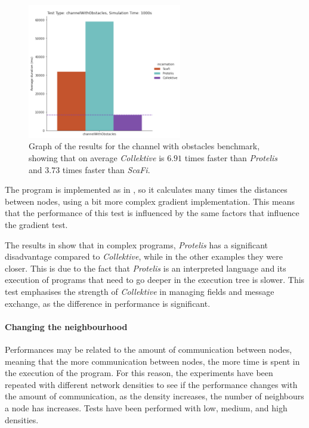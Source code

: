 \begin{figure}[ht!]
    \centering
    \includegraphics[width=0.6\textwidth]{figures/channel-results}
    \caption{Graph of the results for the channel with obstacles benchmark, showing that on average \emph{Collektive} is $6.91$ times faster
    than \emph{Protelis} and $3.73$ times faster than \emph{ScaFi}.}
    \label{fig:channel-with-obstacles}
\end{figure}

The program is implemented as in , so it calculates many times the distances
between nodes, using a bit more complex gradient implementation.
This means that the performance of this test is influenced by the same factors that influence the gradient test.

The results in  show that in complex programs, \emph{Protelis} has a significant
disadvantage compared to \emph{Collektive}, while in the other examples they were closer.
This is due to the fact that \emph{Protelis} is an interpreted language and its execution of programs that need to go
deeper in the execution tree is slower.
This test emphasises the strength of \emph{Collektive} in managing fields and message exchange, as the difference in
performance is significant.

\paragraph{Changing the neighbourhood}
Performances may be related to the amount of communication between nodes, meaning that the more communication
between nodes, the more time is spent in the execution of the program.
For this reason, the experiments have been repeated with different network densities to see if the performance changes with
the amount of communication, as the density increases, the number of neighbours a node has increases.
Tests have been performed with low, medium, and high densities.


